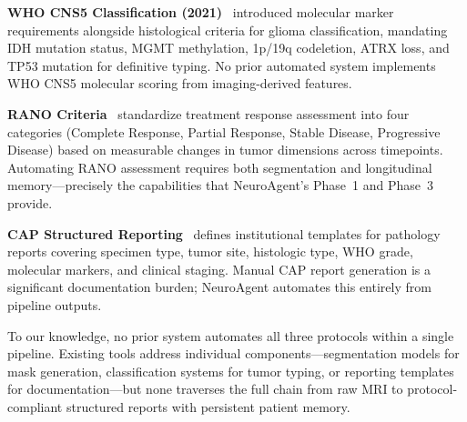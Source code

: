 \textbf{WHO CNS5 Classification (2021)}~\cite{louis2021who} introduced molecular marker requirements alongside histological criteria for glioma classification, mandating IDH mutation status, MGMT methylation, 1p/19q codeletion, ATRX loss, and TP53 mutation for definitive typing. No prior automated system implements WHO CNS5 molecular scoring from imaging-derived features.

\textbf{RANO Criteria}~\cite{wen2010rano} standardize treatment response assessment into four categories (Complete Response, Partial Response, Stable Disease, Progressive Disease) based on measurable changes in tumor dimensions across timepoints. Automating RANO assessment requires both segmentation and longitudinal memory---precisely the capabilities that NeuroAgent's Phase~1 and Phase~3 provide.

\textbf{CAP Structured Reporting}~\cite{cap2024} defines institutional templates for pathology reports covering specimen type, tumor site, histologic type, WHO grade, molecular markers, and clinical staging. Manual CAP report generation is a significant documentation burden; NeuroAgent automates this entirely from pipeline outputs.

To our knowledge, no prior system automates all three protocols within a single pipeline. Existing tools address individual components---segmentation models for mask generation, classification systems for tumor typing, or reporting templates for documentation---but none traverses the full chain from raw MRI to protocol-compliant structured reports with persistent patient memory.


